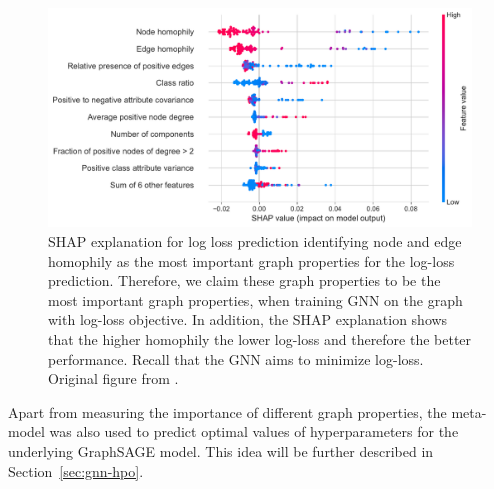 \begin{figure}
	\includegraphics[width=\linewidth]{images/graph-property-importance.pdf}
	\caption{SHAP explanation for log loss prediction identifying node and edge homophily as the most important graph properties for the log-loss prediction. Therefore, we claim these graph properties to be the most important graph properties, when training GNN on the graph with log-loss objective. In addition, the SHAP explanation shows that the higher homophily the lower log-loss and therefore the better performance. Recall that the GNN aims to minimize log-loss. Original figure from \cite{prochazka_which_2023}.}
	\label{fig:graph-property-importance}
\end{figure}

Apart from measuring the importance of different graph properties, the meta-model was also used to predict optimal values of hyperparameters for the underlying GraphSAGE model. This idea will be further described in Section~\ref{sec:gnn-hpo}.
